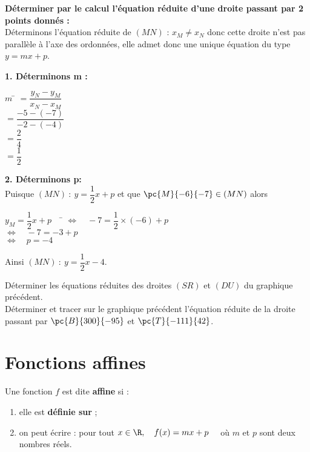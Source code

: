 \documentclass[a4paper,11pt,cours]{nsi}
\begin{document}
\begin{methode}\textbf{Déterminer par le calcul l'équation réduite d'une droite passant par 2 points donnés :}\\[.5em]
	Déterminons l'équation réduite de $(MN)$ : $x_M\neq x_N$ donc cette droite n'est pas parallèle à l'axe des ordonnées, elle admet donc une 
	unique équation du type $y=mx+p$.
	\begin{multicols}{2}
		\textbf{1. Déterminons m :}
		\begin{tabbing}
			$m$	\= 	$=\dfrac{y_N-y_M}{x_N-x_M}$	\\[0.4em]	
			\>	$=\dfrac{-5-(-7)}{-2-(-4)}$	\\[0.4em]
			\>	$=\dfrac{2}{4}$	\\[0.4em]
			\>	$=\dfrac{1}{2}$
		\end{tabbing}
		\columnbreak
		\textbf{2. Déterminons p:}\\
		Puisque $(MN)\ :\ y=\dfrac{1}{2}x+p$ et que $\pc{M}{-6}{-7}\in(MN)$ alors
		\begin{tabbing}
			$y_M=\dfrac{1}{2}x+p\quad$	\=	$\Leftrightarrow\quad -7=\dfrac{1}{2}\times(-6)+p$\\[0.3em]
			\>	$\Leftrightarrow\quad -7=-3+p$\\
			\>	$\Leftrightarrow\quad p=-4$
		\end{tabbing}
	\end{multicols}
	\begin{center}
		Ainsi $(MN)\ :\ y=\dfrac{1}{2}x-4$.
	\end{center}
\end{methode}


\begin {exercice}
Déterminer les équations réduites des droites $(SR)$ et $(DU)$ du graphique précédent.\\

Déterminer et tracer sur le graphique précédent l'équation réduite de la droite passant par $\pc{B}{300}{-95}$ et $\pc{T}{-111}{42}$.
\end {exercice}

\section{Fonctions affines}
\begin{definition}[]
	Une fonction $f$ est dite \textbf{affine} si :
	\begin{enumerate}[label=\textbullet]
		\item 	elle est \textbf{définie sur \R} ;
		\item 	on peut écrire : pour tout $x \in \R, \quad f(x)=mx+p \quad$ où $m$ et $p$ sont deux nombres réels.
	\end{enumerate}
\end{definition}
\end{document}
